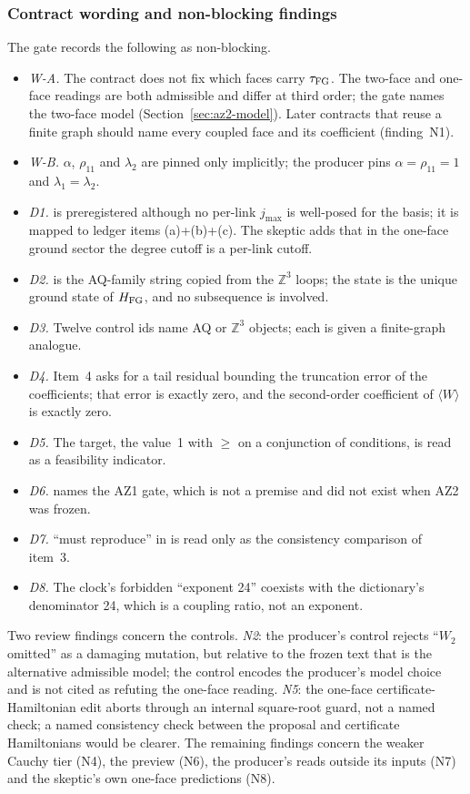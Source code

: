 \subsubsection{Contract wording and non-blocking findings}
\label{sec:az2-findings}
The gate records the following as non-blocking.
\begin{itemize}
\item \emph{W-A.} The contract does not fix which faces carry $\tau_{\mathrm{FG}}$. The
 two-face and one-face readings are both admissible and differ at third
 order; the gate names the two-face model (Section~\ref{sec:az2-model}).
 Later contracts that reuse a finite graph should name every coupled face and
 its coefficient (finding~N1).
\item \emph{W-B.} $\alpha$, $\rho_{11}$ and $\lambda_2$ are pinned only
 implicitly; the producer pins $\alpha=\rho_{11}=1$ and $\lambda_1=\lambda_2$.
\item \emph{D1.}  is preregistered although no per-link
 $j_{\max}$ is well-posed for the basis; it is mapped to ledger items
 (a)+(b)+(c). The skeptic adds that in the one-face ground sector the degree
 cutoff is a per-link cutoff.
\item \emph{D2.}  is the AQ-family string copied from
 the $\mathbb Z^3$ loops; the state is the unique ground state of
 $H_{\rm FG}$, and no subsequence is involved.
\item \emph{D3.} Twelve control ids name AQ or $\mathbb Z^3$ objects; each is
 given a finite-graph analogue.
\item \emph{D4.} Item~4 asks for a tail residual bounding the truncation error
 of the coefficients; that error is exactly zero, and the second-order
 coefficient of $\langle W\rangle$ is exactly zero.
\item \emph{D5.} The target, the value~1 with $\ge$ on a conjunction of
 conditions, is read as a feasibility indicator.
\item \emph{D6.}  names the AZ1 gate, which is not a
 premise and did not exist when AZ2 was frozen.
\item \emph{D7.} ``must reproduce'' in  is read
 only as the consistency comparison of item~3.
\item \emph{D8.} The clock's forbidden ``exponent 24'' coexists with the
 dictionary's denominator 24, which is a coupling ratio, not an exponent.
\end{itemize}
Two review findings concern the controls. \emph{N2}: the producer's
 control rejects ``$W_2$ omitted'' as a damaging
mutation, but relative to the frozen text that is the alternative admissible
model; the control encodes the producer's model choice and is not cited as
refuting the one-face reading. \emph{N5}: the one-face certificate-Hamiltonian
edit aborts through an internal square-root guard, not a named check; a named
consistency check between the proposal and certificate Hamiltonians would be
clearer. The remaining findings concern the weaker Cauchy tier (N4), the
preview (N6), the producer's reads outside its inputs (N7) and the skeptic's
own one-face predictions (N8).

